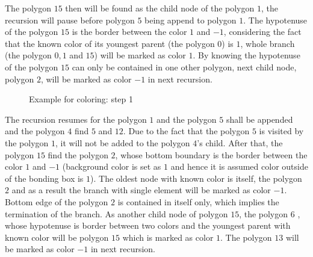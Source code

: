 The polygon $15$ then will be found as the child node of the polygon $1$, the recursion will pause before polygon $5$ being append to polygon $1$.
The hypotenuse of the polygon $15$ is the border between the color $1$ and $-1$, considering the fact that the known color of its youngest parent (the polygon $0$) is $1$, whole branch (the polygon $0,1$ and $15$) will be marked as color $1$.
By knowing the hypotenuse of the polygon $15$ can only be contained in one other polygon, next child node, polygon $2$, will be marked as color $-1$ in next recursion.
    \begin{figure}[h!]
        \centering
        \caption{Example for coloring: step 1}
        \label{qdt_fig:qdt_color_tree_0}
    \end{figure}
The recursion resumes for the polygon $1$ and the polygon $5$ shall be appended and the polygon $4$ find $5$ and $12$.
Due to the fact that the polygon $5$ is visited by the polygon $1$, it will not be added to the polygon $4$'s child.
After that, the polygon $15$ find the polygon $2$, whose bottom boundary is the border between the color $1$ and $-1$ (background color is set as $1$ and hence it is assumed color outside of the bonding box is $1$).
The oldest node with known color is itself, the polygon $2$ and as a result the branch with single element will be marked as color $-1$.
Bottom edge of the polygon $2$ is contained in itself only, which implies the termination of the branch.
As another child node of polygon $15$, the polygon $6$ , whose hypotenuse is border between two colors and the youngest parent with known color will be polygon $15$ which is marked as color $1$.
The polygon $13$ will be marked as color $-1$ in next recursion.
%
